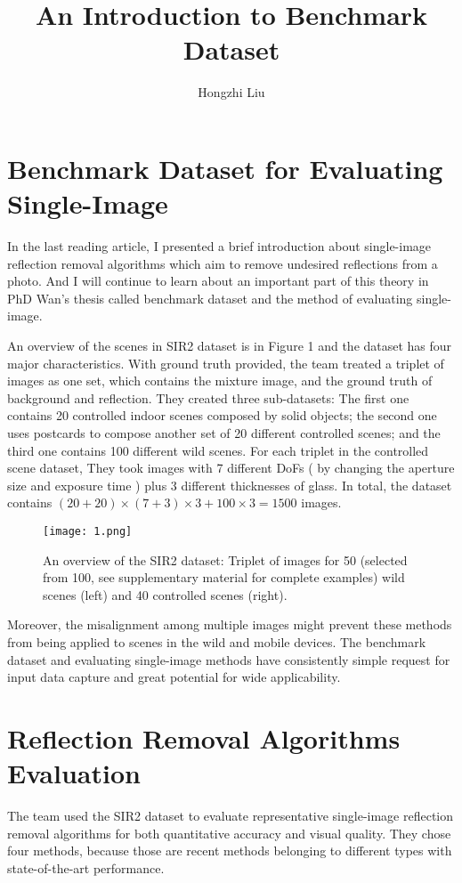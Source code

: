 \documentclass{article}
\author{Hongzhi Liu}
\title{An Introduction to Benchmark Dataset}
\begin{document}
  \maketitle
  \section{Benchmark Dataset for Evaluating Single-Image}
  \par
  In the last reading article, I presented a brief introduction about single-image reflection removal algorithms which aim to remove undesired reflections from a photo. And I will continue to learn about an important part of this theory in PhD Wan's thesis called benchmark dataset and the method of evaluating single-image.
  
  An overview of the scenes in SIR2 dataset is in Figure 1 and the dataset has four major characteristics. With ground truth provided, the team treated a triplet of images as one set, which contains the mixture image, and the ground truth of background and reflection. They created three sub-datasets: The first one contains 20 controlled indoor scenes composed by solid objects; the second one uses postcards to compose another set of 20 different controlled scenes; and the third one contains 100 different wild scenes. For each triplet in the controlled scene dataset, They took images with 7 different DoFs ( by changing the aperture size and exposure time ) plus 3 different thicknesses of glass. In total, the dataset contains $(20 + 20)\times(7 + 3)\times3 + 100\times3 = 1500$ images. 
\begin{figure}[ht]
\centering
\texttt{[image: 1.png]}
\caption{An overview of the SIR2 dataset: Triplet of images for 50 (selected from 100, see supplementary material for complete examples) wild scenes (left) and 40 controlled scenes (right).}
\end{figure}
 
  Moreover, the misalignment among multiple images might prevent these methods from being applied to scenes in the wild and mobile devices. The benchmark dataset and evaluating single-image methods have consistently simple request for input data capture and great potential for wide applicability.

  \section{Reflection Removal Algorithms Evaluation}
  \par
  The team used the SIR2 dataset to evaluate representative single-image reflection removal algorithms for both quantitative accuracy and visual quality. They chose four methods, because those are recent methods belonging to different types with state-of-the-art performance.
  
\end{document}
